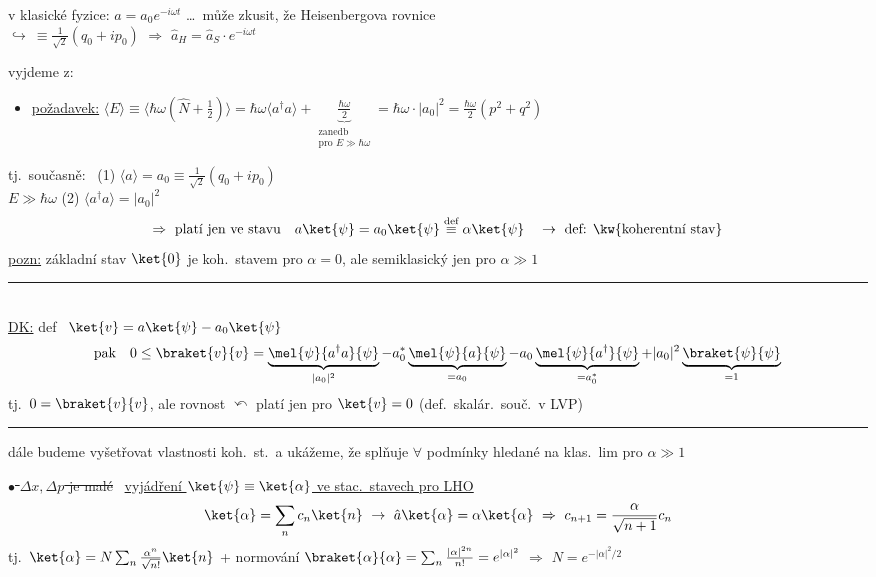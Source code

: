 v klasické fyzice: \quad $a = a_0e^{-i\omega t}$ \quad \dots\ může zkusit, že Heisenbergova rovnice \\
\hspace*{3cm} $\hookrightarrow\ \equiv\frac{1}{\sqrt2}(q_0 + ip_0)$ \hspace{1.5cm} $\Rightarrow$ \quad $\hat a_H = \hat a_S\cdot e^{-i\omega t}$

vyjdeme z:
\begin{itemize}
  \item \underline{požadavek:} \quad
        $\langle E\rangle \equiv \langle\hbar\omega(\hat N + \tfrac12)\rangle = \hbar\omega\langle a^\dagger a\rangle + \underbrace{\tfrac{\hbar\omega}{2}}_{\substack{\text{zanedb}\\ \text{pro } E\gg\hbar\omega}}
         = \hbar\omega\cdot|a_0|^2 = \frac{\hbar\omega}{2}(p^2 + q^2)$
\end{itemize}
\quad tj.\ současně: \ (1) $\langle a\rangle = a_0 \equiv \frac{1}{\sqrt2}(q_0 + ip_0)$ \\
\quad $E\gg\hbar\omega$ \qquad\quad (2) $\langle a^\dagger a\rangle = |a_0|^2$
\[
  \Rightarrow\ \text{platí jen ve stavu}\quad a\ket{\psi} = a_0\ket{\psi} \overset{\text{def}}{\equiv} \alpha\ket{\psi}
  \quad\to\ \text{def: \kw{koherentní stav}}
\]
\underline{pozn:} základní stav $\ket{0}$ je koh.\ stavem pro $\alpha = 0$, ale semiklasický jen pro $\alpha\gg1$

\noindent\rule{0.7\linewidth}{0.3pt} \\
\underline{DK:} \quad def \ $\ket{v} = a\ket{\psi} - a_0\ket{\psi}$
\[
  \text{pak}\quad 0 \leq \braket{v}{v} = \underbrace{\mel{\psi}{a^\dagger a}{\psi}}_{|a_0|^2} - a_0^*\underbrace{\mel{\psi}{a}{\psi}}_{=a_0}
  - a_0\underbrace{\mel{\psi}{a^\dagger}{\psi}}_{=a_0^*} + |a_0|^2\underbrace{\braket{\psi}{\psi}}_{=1}
\]
\quad tj.\ $0 = \braket{v}{v}$, ale rovnost $\curvearrowleft$ platí jen pro $\ket{v} = 0$ \quad (def.\ skalár.\ souč.\ v LVP) \\
\noindent\rule{0.7\linewidth}{0.3pt}

dále budeme vyšetřovat vlastnosti koh.\ st.\ a ukážeme, že splňuje $\forall$ podmínky hledané na klas.\ lim pro $\alpha\gg1$

\sout{$\bullet$ $\Delta x,\Delta p$ je malé} \ \underline{vyjádření $\ket{\psi}\equiv\ket{\alpha}$ ve stac.\ stavech pro LHO}
\[
  \ket{\alpha} = \sum_n c_n\ket{n} \ \to\ \hat a\ket{\alpha} = \alpha\ket{\alpha} \ \Rightarrow\ c_{n+1} = \frac{\alpha}{\sqrt{n+1}}c_n
\]
tj.\ \quad $\ket{\alpha} = N\sum_n\frac{\alpha^n}{\sqrt{n!}}\ket{n}$ \quad + normování \quad
$\braket{\alpha}{\alpha} = \sum_n\frac{|\alpha|^{2n}}{n!} = e^{|\alpha|^2}$ \quad $\Rightarrow$ \quad $N = e^{-|\alpha|^2/2}$

